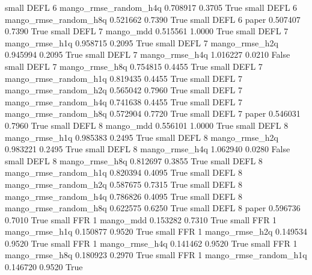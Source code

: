      small     DEFL                 6 mango_rmse_random_h4q   0.708917      0.3705    True
     small     DEFL                 6 mango_rmse_random_h8q   0.521662      0.7390    True
     small     DEFL                 6                 paper   0.507407      0.7390    True
     small     DEFL                 7             mango_mdd   0.515561      1.0000    True
     small     DEFL                 7        mango_rmse_h1q   0.958715      0.2095    True
     small     DEFL                 7        mango_rmse_h2q   0.945994      0.2095    True
     small     DEFL                 7        mango_rmse_h4q   1.016227      0.0210   False
     small     DEFL                 7        mango_rmse_h8q   0.754815      0.4455    True
     small     DEFL                 7 mango_rmse_random_h1q   0.819435      0.4455    True
     small     DEFL                 7 mango_rmse_random_h2q   0.565042      0.7960    True
     small     DEFL                 7 mango_rmse_random_h4q   0.741638      0.4455    True
     small     DEFL                 7 mango_rmse_random_h8q   0.572904      0.7720    True
     small     DEFL                 7                 paper   0.546031      0.7960    True
     small     DEFL                 8             mango_mdd   0.556101      1.0000    True
     small     DEFL                 8        mango_rmse_h1q   0.985383      0.2495    True
     small     DEFL                 8        mango_rmse_h2q   0.983221      0.2495    True
     small     DEFL                 8        mango_rmse_h4q   1.062940      0.0280   False
     small     DEFL                 8        mango_rmse_h8q   0.812697      0.3855    True
     small     DEFL                 8 mango_rmse_random_h1q   0.820394      0.4095    True
     small     DEFL                 8 mango_rmse_random_h2q   0.587675      0.7315    True
     small     DEFL                 8 mango_rmse_random_h4q   0.786826      0.4095    True
     small     DEFL                 8 mango_rmse_random_h8q   0.622575      0.6250    True
     small     DEFL                 8                 paper   0.596736      0.7010    True
     small      FFR                 1             mango_mdd   0.153282      0.7310    True
     small      FFR                 1        mango_rmse_h1q   0.150877      0.9520    True
     small      FFR                 1        mango_rmse_h2q   0.149534      0.9520    True
     small      FFR                 1        mango_rmse_h4q   0.141462      0.9520    True
     small      FFR                 1        mango_rmse_h8q   0.180923      0.2970    True
     small      FFR                 1 mango_rmse_random_h1q   0.146720      0.9520    True
